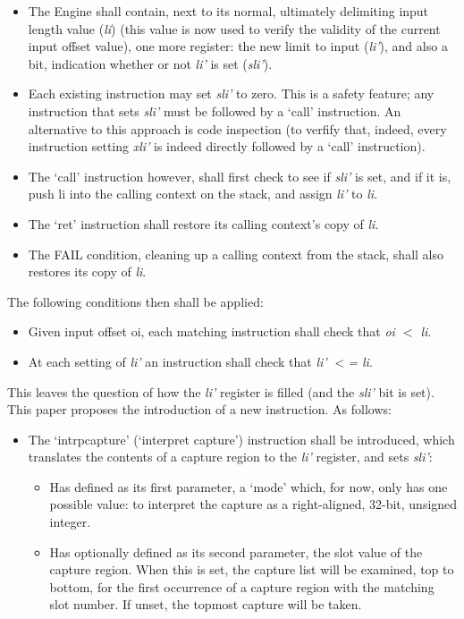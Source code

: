 \begin{itemize}
    \item The Engine shall contain, next to its normal, ultimately 
delimiting input length value (\textit{li})
(this value is now used to verify the 
validity of the current input offset value), one more register: the new 
limit to input (\textit{li’}), and also a bit, indication whether or
not \textit{li’} is set (\textit{sli’}).
    \item Each existing instruction may set \textit{sli’} to zero.
This is a safety 
feature; any instruction that sets \textit{sli’} must be followed by a ‘call’ 
instruction. An alternative to this approach is code inspection (to 
verfify that, indeed, every instruction setting \textit{xli’} is indeed
directly followed by a ‘call’ instruction).
    \item The ‘call’ instruction however, shall first check to see if 
\textit{sli’} is set, and if it is, push li into the calling context on the 
stack, and assign \textit{li’} to \textit{li}.
    \item The ‘ret’ instruction shall restore its calling context’s 
copy of \textit{li}.
    \item The FAIL condition, cleaning up a calling context from the stack, 
shall also restores its copy of \textit{li}.
\end{itemize}
The following conditions then shall be applied:
\begin{itemize}
    \item Given input offset oi, each matching instruction shall check that 
\textit{oi $<$ li}.
    \item At each setting of \textit{li’} an instruction shall check that
\textit{li’ $<$= li}.
\end{itemize}


This leaves the question of how the \textit{li’} register is filled (and the 
\textit{sli’} bit is set). This paper proposes the introduction of a new 
instruction. As follows:

\begin{itemize}
    \item The ‘intrpcapture’ (‘interpret capture’) instruction shall 
be introduced, which translates the contents of a capture region to the 
\textit{li’} register, and sets \textit{sli’}:
    \begin{itemize}
        \item Has defined as its first parameter, a ‘mode’ which, for 
now, only has one possible value: to interpret the capture as a 
right-aligned, 32-bit, unsigned integer.
        \item Has optionally defined as its second parameter, the slot value 
of the capture region. When this is set, the capture list will be 
examined, top to bottom, for the first occurrence of a capture region with 
the matching slot number. If unset, the topmost capture will be taken.
    \end{itemize}
\end{itemize}

